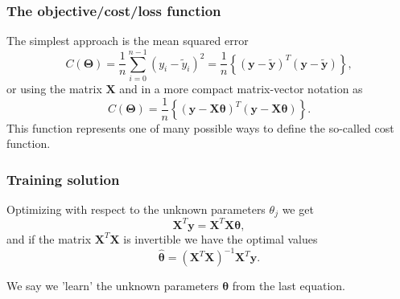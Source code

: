 \documentclass{beamer}
\begin{document}
\begin{frame}
\frametitle{The objective/cost/loss function}

The  simplest approach is the mean squared error
\[
C(\bm{\Theta})=\frac{1}{n}\sum_{i=0}^{n-1}\left(y_i-\tilde{y}_i\right)^2=\frac{1}{n}\left\{\left(\bm{y}-\bm{\tilde{y}}\right)^T\left(\bm{y}-\bm{\tilde{y}}\right)\right\},
\]
or using the matrix $\bm{X}$ and in a more compact matrix-vector notation as
\[
C(\bm{\Theta})=\frac{1}{n}\left\{\left(\bm{y}-\bm{X}\bm{\theta}\right)^T\left(\bm{y}-\bm{X}\bm{\theta}\right)\right\}.
\]
This function represents one of many possible ways to define the so-called cost function.
\end{frame}

\begin{frame}
\frametitle{Training solution}

Optimizing with respect to the unknown parameters $\theta_j$ we get 
\[
\bm{X}^T\bm{y} = \bm{X}^T\bm{X}\bm{\theta},  
\]
and if the matrix $\bm{X}^T\bm{X}$ is invertible we have the optimal values
\[
\hat{\bm{\theta}} =\left(\bm{X}^T\bm{X}\right)^{-1}\bm{X}^T\bm{y}.
\]

We say we 'learn' the unknown parameters $\bm{\theta}$ from the last equation.
\end{frame}
\end{document}
